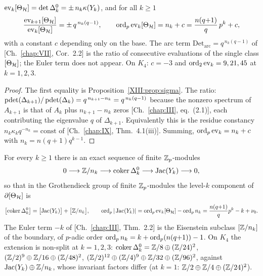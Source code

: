 \begin{theorem}\label{XIII:thm:eval}
$\operatorname{ev}_k[\Theta_{\mathcal{H}}]=\det\Delta_k^{0}=\pm\,n_k\kappa(Y_k)$, and for all $k\ge1$
\[
\frac{\operatorname{ev}_{k+1}[\Theta_{\mathcal{H}}]}{\operatorname{ev}_k[\Theta_{\mathcal{H}}]}=\pm\,q^{\,n_k(q-1)},\qquad
\operatorname{ord}_p\operatorname{ev}_k[\Theta_{\mathcal{H}}]=n_k+c=\frac{n(q{+}1)}{q}\,p^{k}+c ,
\]
with a constant $c$ depending only on the base. The arc term $\mathrm{Det_{arc}}=q^{\,n_k(q-1)}$
of {\rm[Ch.~\ref{chap:VII}, Cor.~2.2]} is the ratio of consecutive evaluations of the single class
$[\Theta_{\mathcal{H}}]$; the Euler term does not appear. On $K_4$: $c=-3$ and
$\operatorname{ord}_2\operatorname{ev}_k=9,21,45$ at $k=1,2,3$.
\end{theorem}

\begin{proof}
The first equality is Proposition~\ref{XIII:prop:sigma}. The ratio: $\operatorname{pdet}(\Delta_{k+1})/\operatorname{pdet}(\Delta_k)
=q^{\,n_{k+1}-n_k}=q^{\,n_k(q-1)}$ because the nonzero spectrum of $A_{k+1}$ is that of $A_k$
plus $n_{k+1}-n_k$ zeros [Ch.~\ref{chap:III}, eq.~(2.1)], each contributing the eigenvalue $q$ of
$\Delta_{k+1}$. Equivalently this is the residue constancy $n_k\kappa_kq^{-n_k}=\mathrm{const}$
of [Ch.~\ref{chap:IX}, Thm.~4.1(iii)]. Summing, $\operatorname{ord}_p\operatorname{ev}_k=n_k+c$ with $n_k=n(q{+}1)q^{k-1}$.
\end{proof}

\begin{theorem}\label{XIII:thm:boundary}
For every $k\ge1$ there is an exact sequence of finite $\mathbb{Z}_p$-modules
\[
0\longrightarrow\mathbb{Z}/n_k\longrightarrow\operatorname{coker}\Delta_k^{0}\longrightarrow\operatorname{Jac}(Y_k)\longrightarrow0,
\]
so that in the Grothendieck group of finite $\mathbb{Z}_p$-modules the level-$k$ component of
$\partial[\Theta_{\mathcal{H}}]$ is
\[
\bigl[\operatorname{coker}\Delta_k^{0}\bigr]=\bigl[\operatorname{Jac}(Y_k)\bigr]+\bigl[\mathbb{Z}/n_k\bigr],
\qquad
\operatorname{ord}_p|\operatorname{Jac}(Y_k)|=\operatorname{ord}_p\operatorname{ev}_k[\Theta_{\mathcal{H}}]-\operatorname{ord}_pn_k=\frac{n(q{+}1)}{q}p^{k}-k+\nu_0 .
\]
The Euler term $-k$ of {\rm[Ch.~\ref{chap:III}, Thm.~2.2]} is the Eisenstein subclass $[\mathbb{Z}/n_k]$ of the
boundary, of $p$-adic order $\operatorname{ord}_pn_k=k+\operatorname{ord}_p(n(q{+}1))-1$. On $K_4$ the extension is
non-split at $k=1,2,3$: $\operatorname{coker}\Delta_k^{0}=\mathbb{Z}/8\oplus(\mathbb{Z}/24)^{2}$,
$(\mathbb{Z}/2)^{9}\oplus\mathbb{Z}/16\oplus(\mathbb{Z}/48)^{2}$, $(\mathbb{Z}/2)^{12}\oplus(\mathbb{Z}/4)^{9}\oplus\mathbb{Z}/32\oplus(\mathbb{Z}/96)^{2}$,
against $\operatorname{Jac}(Y_k)\oplus\mathbb{Z}/n_k$, whose invariant factors differ (at $k=1$:
$\mathbb{Z}/2\oplus\mathbb{Z}/4\oplus(\mathbb{Z}/24)^{2}$).
\end{theorem}

